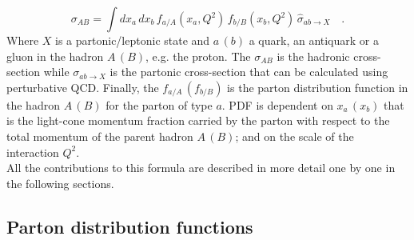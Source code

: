 \begin{equation}
	\sigma_{AB}=\displaystyle\int dx_a\,dx_b\,f_{a/A}(x_a,Q^2)\,f_{b/B}(x_b,Q^2)\,\hat{\sigma}_{ab \rightarrow X}\quad .
\label{eq:factorization2}
\end{equation}
Where $X$ is a partonic/leptonic state and $a\,(b)$ a quark, an antiquark or a gluon in the hadron $A\,(B)$, e.g. the proton. The $\sigma_{AB}$ is the hadronic cross-section while $\sigma_{ab\rightarrow X}$ is the partonic cross-section that can be calculated using perturbative QCD. Finally, the $f_{a/A}\,(f_{b/B})$ is the parton distribution function  in the hadron $A\,(B)$ for the parton of type $a$. PDF is dependent on $x_a\,(x_b)$ that is the light-cone momentum fraction carried by the parton with respect to the total momentum of the parent hadron $A\,(B)$; and on the scale of the interaction $Q^2$. 
\\
All the contributions to this formula are described in more detail one by one in the following sections.

\subsection{Parton distribution functions}

